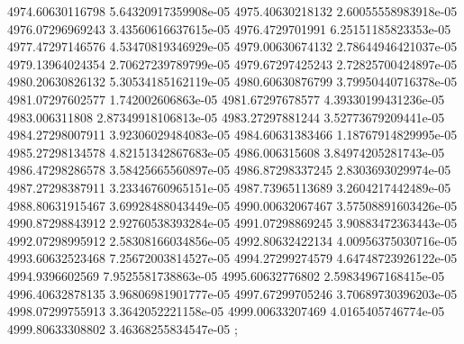 {4974.60630116798 5.64320917359908e-05
4975.40630218132 2.60055558983918e-05
4976.07296969243 3.43560616637615e-05
4976.4729701991 6.25151185823353e-05
4977.47297146576 4.53470819346929e-05
4979.00630674132 2.78644946421037e-05
4979.13964024354 2.70627239789799e-05
4979.67297425243 2.72825700424897e-05
4980.20630826132 5.30534185162119e-05
4980.60630876799 3.79950440716378e-05
4981.07297602577 1.742002606863e-05
4981.67297678577 4.39330199431236e-05
4983.006311808 2.87349918106813e-05
4983.27297881244 3.52773679209441e-05
4984.27298007911 3.92306029484083e-05
4984.60631383466 1.18767914829995e-05
4985.27298134578 4.82151342867683e-05
4986.006315608 3.84974205281743e-05
4986.47298286578 3.58425665560897e-05
4986.87298337245 2.8303693029974e-05
4987.27298387911 3.23346760965151e-05
4987.73965113689 3.2604217442489e-05
4988.80631915467 3.69928488043449e-05
4990.00632067467 3.57508891603426e-05
4990.87298843912 2.92760538393284e-05
4991.07298869245 3.90883472363443e-05
4992.07298995912 2.58308166034856e-05
4992.80632422134 4.00956375030716e-05
4993.60632523468 7.25672003814527e-05
4994.27299274579 4.64748723926122e-05
4994.9396602569 7.9525581738863e-05
4995.60632776802 2.59834967168415e-05
4996.40632878135 3.96806981901777e-05
4997.67299705246 3.70689730396203e-05
4998.07299755913 3.3642052221158e-05
4999.00633207469 4.0165405746774e-05
4999.80633308802 3.46368255834547e-05
};